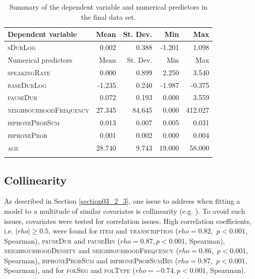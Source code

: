 \begin{table}\fontsize{10}{11}
\caption{Summary of the dependent variable and numerical predictors in the final data set.}
\label{tab:4.3}
\centering
\begin{tabular}{lrrrr} 
\lsptoprule
Dependent variable     & Mean   & St. Dev. & Min        & Max      \\ 
\midrule
\textsc{sDurLog}                & 0.002  & 0.388    & -1.201 & 1.098   \\ 
\midrule
Numerical predictors   & Mean   & St. Dev. & Min        & Max      \\ 
\midrule
\textsc{speakingRate}           & 0.000 & 0.899    & 2.250      & 3.540    \\
\textsc{baseDurLog}             & -1.235  & 0.240    & -1.987      & -0.375    \\
\textsc{pauseDur}               & 0.072  & 0.193    & 0.000      & 3.559    \\
\textsc{neighbourhoodFrequency} & 27.345 & 84.645   & 0.000      & 412.027  \\
\textsc{biphoneProbSum}         & 0.013  & 0.007    & 0.005      & 0.031    \\
\textsc{biphoneProb}            & 0.001  & 0.002    & 0.000      & 0.004    \\
\textsc{age}                    & 28.740 & 9.743    & 19.000     & 58.000   \\
\lspbottomrule
\end{tabular}
\end{table}


\subsection{Collinearity}\label{section04_2_3}

As described in Section \ref{section03_2_3}, one issue to address when fitting a model to a multitude of similar covariates is collinearity (e.g. \cite{Tomaschek2018collin}). To avoid such issues, covariates were tested for correlation issues. High correlation coefficients, i.e. $|rho|≥0.5$, were found for \textsc{item} and \textsc{transcription} ($rho=0.82,$ $p<0.001$, Spearman), \textsc{pauseDur} and \textsc{pauseBin} ($rho=0.87,p<0.001$, Spearman), \textsc{neighbourhoodDensity} and \textsc{neighbourhoodFrequency} ($rho=0.86,$ $p<0.001$, Spearman), \textsc{biphoneProbSum} and \textsc{biphoneProbSumBin} ($rho=0.87,$ $p<0.001$, Spearman), and for \textsc{folSeg} and \textsc{folType} ($rho=-0.74,p<0.001$, Spearman).    

